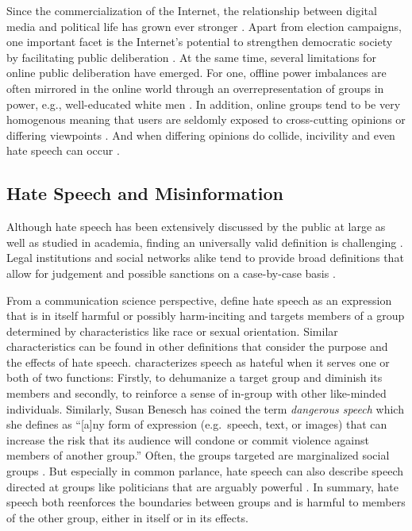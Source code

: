 \documentclass[runningheads]{llncs}
\begin{document}
Since the commercialization of the Internet, the relationship between digital media and political life has grown ever stronger \autocite{boulianneTwentyYearsDigital2018}.
Apart from election campaigns, one important facet is the Internet's potential to strengthen democratic society by facilitating public deliberation \autocite{papacharissiVirtualSphereInternet2002,chenOnlineIncivilityPublic2017}.
At the same time, several limitations for online public deliberation have emerged.
For one, offline power imbalances are often mirrored in the online world through an overrepresentation of groups in power, e.g., well-educated white men \autocite{feezellPredictingOnlinePolitical2016}. In addition, online groups tend to be very homogenous meaning that users are seldomly exposed to cross-cutting opinions or differing viewpoints \autocite{colleoniEchoChamberPublic2014}. And when differing opinions do collide, incivility and even hate speech can occur \autocite{papacharissiDemocracyOnlineCivility2004,coeOnlineUncivilPatterns2014,rainsIncivilityPoliticalIdentity2017}.

\hypertarget{hate-speech-and-misinformation}{%
\subsection{Hate Speech and Misinformation}\label{hate-speech-and-misinformation}}

Although hate speech has been extensively discussed by the public at large as well as studied in academia, finding an universally valid definition is challenging \autocite{gagliardoneCounteringOnlineHate2015}. Legal institutions and social networks alike tend to provide broad definitions that allow for judgement and possible sanctions on a case-by-case basis \autocite{gagliardoneCounteringOnlineHate2015}.

From a communication science perspective, \textcite{erjavecYouDonUnderstand2012} define hate speech as an expression that is in itself harmful or possibly harm-inciting and targets members of a group determined by characteristics like race or sexual orientation. Similar characteristics can be found in other definitions that consider the purpose and the effects of hate speech. \textcite{waldronHarmHateSpeech2012} characterizes speech as hateful when it serves one or both of two functions: Firstly, to dehumanize a target group and diminish its members and secondly, to reinforce a sense of in-group with other like-minded individuals. Similarly, Susan Benesch has coined the term \emph{dangerous speech} which she defines as \enquote{{[}a{]}ny form of expression (e.g.~speech, text, or images) that can increase the risk that its audience will condone or commit violence against members of another group.} \autocite{beneschDangerousSpeechPractical2020} Often, the groups targeted are marginalized social groups \autocite{alvarez-benjumeaNormativeChangeCulture2018}. But especially in common parlance, hate speech can also describe speech directed at groups like politicians that are arguably powerful \autocite{gagliardoneCounteringOnlineHate2015}. In summary, hate speech both reenforces the boundaries between groups and is harmful to members of the other group, either in itself or in its effects.
\end{document}
